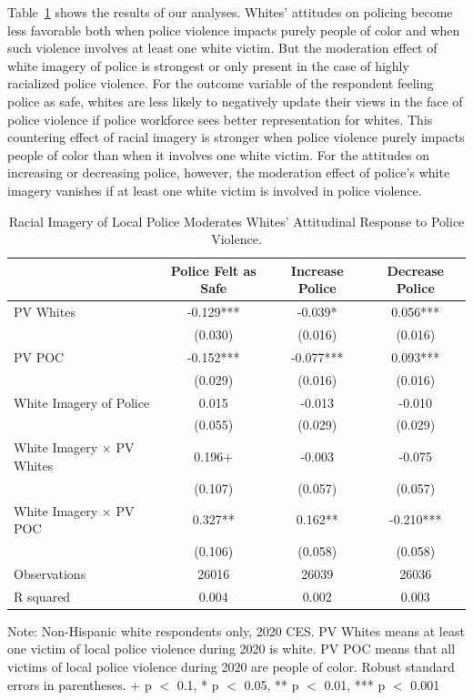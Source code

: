 \documentclass[
  12pt,
]{article}
\begin{document}
Table~\ref{tbl-racial.component} shows the results of our analyses.
Whites' attitudes on policing become less favorable both when police
violence impacts purely people of color and when such violence involves
at least one white victim. But the moderation effect of white imagery of
police is strongest or only present in the case of highly racialized
police violence. For the outcome variable of the respondent feeling
police as safe, whites are less likely to negatively update their views
in the face of police violence if police workforce sees better
representation for whites. This countering effect of racial imagery is
stronger when police violence purely impacts people of color than when
it involves one white victim. For the attitudes on increasing or
decreasing police, however, the moderation effect of police's white
imagery vanishes if at least one white victim is involved in police
violence.

\hypertarget{tbl-racial.component}{}
\begin{table}
\caption{\label{tbl-racial.component}Racial Imagery of Local Police Moderates Whites' Attitudinal Response to
Police Violence. }\tabularnewline

\centering
\begin{threeparttable}
\begin{tabular}[t]{lccc}
\toprule
  & Police Felt as Safe & Increase Police & Decrease Police\\
\midrule
PV Whites & -0.129*** & -0.039* & 0.056***\\
 & (0.030) & (0.016) & (0.016)\\
PV POC & -0.152*** & -0.077*** & 0.093***\\
 & (0.029) & (0.016) & (0.016)\\
White Imagery of Police & 0.015 & -0.013 & -0.010\\
 & (0.055) & (0.029) & (0.029)\\
White Imagery × PV Whites & 0.196+ & -0.003 & -0.075\\
 & (0.107) & (0.057) & (0.057)\\
White Imagery × PV POC & 0.327** & 0.162** & -0.210***\\
 & (0.106) & (0.058) & (0.058)\\
\midrule
Observations & 26016 & 26039 & 26036\\
R squared & 0.004 & 0.002 & 0.003\\
\bottomrule
\end{tabular}
\begin{tablenotes}
\item Note: Non-Hispanic white respondents only, 2020 CES. PV Whites means at least one victim of local police violence during 2020 is white. PV POC means that all victims of local police violence during 2020 are people of color. Robust standard errors in parentheses. + p $<$ 0.1, * p $<$ 0.05, ** p $<$ 0.01, *** p $<$ 0.001
\end{tablenotes}
\end{threeparttable}
\end{table}
\end{document}
